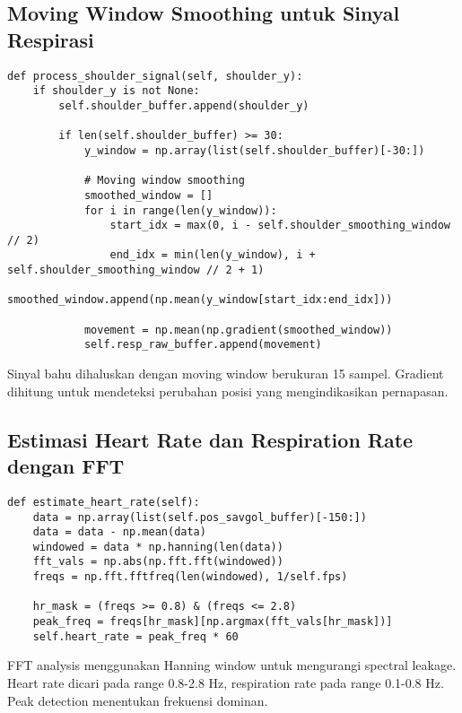 \documentclass[11pt,a4paper]{article}
\begin{document}
\subsection{Moving Window Smoothing untuk Sinyal Respirasi}
    \begin{lstlisting}
def process_shoulder_signal(self, shoulder_y):
    if shoulder_y is not None:
        self.shoulder_buffer.append(shoulder_y)
        
        if len(self.shoulder_buffer) >= 30:
            y_window = np.array(list(self.shoulder_buffer)[-30:])
            
            # Moving window smoothing
            smoothed_window = []
            for i in range(len(y_window)):
                start_idx = max(0, i - self.shoulder_smoothing_window // 2)
                end_idx = min(len(y_window), i + self.shoulder_smoothing_window // 2 + 1)
                smoothed_window.append(np.mean(y_window[start_idx:end_idx]))
            
            movement = np.mean(np.gradient(smoothed_window))
            self.resp_raw_buffer.append(movement)
    \end{lstlisting}
    Sinyal bahu dihaluskan dengan moving window berukuran 15 sampel. Gradient dihitung untuk mendeteksi perubahan posisi yang mengindikasikan pernapasan.

\subsection{Estimasi Heart Rate dan Respiration Rate dengan FFT}
    \begin{lstlisting}
def estimate_heart_rate(self):
    data = np.array(list(self.pos_savgol_buffer)[-150:])
    data = data - np.mean(data)
    windowed = data * np.hanning(len(data))
    fft_vals = np.abs(np.fft.fft(windowed))
    freqs = np.fft.fftfreq(len(windowed), 1/self.fps)
    
    hr_mask = (freqs >= 0.8) & (freqs <= 2.8)
    peak_freq = freqs[hr_mask][np.argmax(fft_vals[hr_mask])]
    self.heart_rate = peak_freq * 60
    \end{lstlisting}
    FFT analysis menggunakan Hanning window untuk mengurangi spectral leakage. Heart rate dicari pada range 0.8-2.8 Hz, respiration rate pada range 0.1-0.8 Hz. Peak detection menentukan frekuensi dominan.
\end{document}
